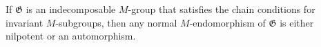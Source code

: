 If $\mathfrak{G}$ is an indecomposable $M$-group that satisfies the chain conditions for invariant $M$-subgroups, then any normal $M$-endomorphism of $\mathfrak{G}$ is either nilpotent or an automorphism.
